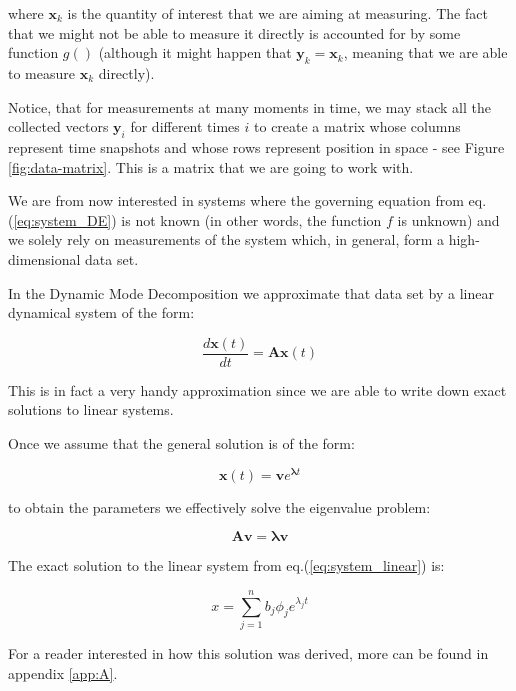 \documentclass[10pt,twocolumn]{article}
\begin{document}
where $\mathbf{x}_k$ is the quantity of interest that we are aiming at measuring. The fact that we might not be able to measure it directly is accounted for by some function $g()$ (although it might happen that $\mathbf{y}_k = \mathbf{x}_k$, meaning that we are able to measure $\mathbf{x}_k$ directly).

Notice, that for measurements at many moments in time, we may stack all the collected vectors $\mathbf{y}_i$ for different times $i$ to create a matrix whose columns represent time snapshots and whose rows represent position in space - see Figure \ref{fig:data-matrix}. This is a matrix that we are going to work with.

We are from now interested in systems where the governing equation from eq.(\ref{eq:system_DE}) is not known (in other words, the function $f$ is unknown) and we solely rely on measurements of the system which, in general, form a high-dimensional data set.

In the Dynamic Mode Decomposition we approximate that data set by a linear dynamical system of the form:

\begin{equation} \label{eq:system_linear}
\frac{d \mathbf{x}(t)}{dt} = \mathbf{A} \mathbf{x}(t)
\end{equation}

This is in fact a very handy approximation since we are able to write down exact solutions to linear systems.

Once we assume that the general solution is of the form:

\begin{equation} \label{eq:general_solution}
\mathbf{x}(t) = \mathbf{v} e^{\bm{\lambda} t}
\end{equation}

to obtain the parameters we effectively solve the eigenvalue problem:

\begin{equation} \label{eq:eigenvalue_solution}
\mathbf{A} \mathbf{v} = \bm{\lambda} \mathbf{v}
\end{equation}

The exact solution to the linear system from eq.(\ref{eq:system_linear}) is:

\begin{equation} \label{eq:soln_exact}
x = \sum_{j = 1}^{n} b_j \phi_j e^{\lambda_j t}
\end{equation}

For a reader interested in how this solution was derived, more can be found in appendix \ref{app:A}. 
\end{document}
